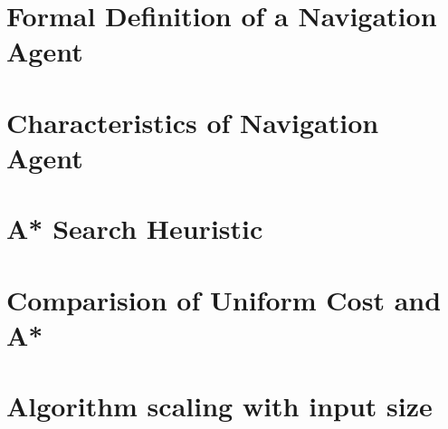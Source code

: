 \documentclass[12pt]{article}
\begin{document}
    \maketitle

    \section{Formal Definition of a Navigation Agent}
    \section{Characteristics of Navigation Agent}
    \section{A* Search Heuristic}
    \section{Comparision of Uniform Cost and A*}
    \section{Algorithm scaling with input size}
\end{document}
